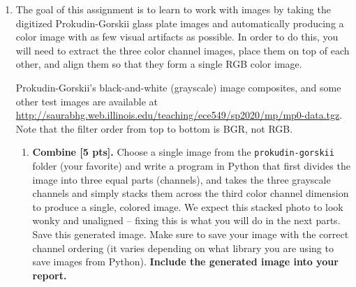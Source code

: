 \documentclass{article}
\def\pts#1{\textbf{[#1 pts]}}
\newenvironment{Q}{\clearpage \item}{\phantom{s} \bigskip}
\begin{document}
\begin{enumerate}
\begin{Q}
The goal of this assignment is to learn to work with images by taking the digitized Prokudin-Gorskii glass plate images and automatically producing a color image with as few visual artifacts as possible. In order to do this, you will need to extract the three color channel images, place them on top of each other, and align them so that they form a single RGB color image. 

Prokudin-Gorskii's black-and-white (grayscale) image composites, and some other test images are available at \url{http://saurabhg.web.illinois.edu/teaching/ece549/sp2020/mp/mp0-data.tgz}. Note that the filter order from top to bottom is BGR, not RGB.

\begin{enumerate}
    \item \textbf{Combine \pts{5}.} Choose a single image from the \texttt{prokudin-gorskii} folder (your favorite) and write a program in Python that first divides the image into three equal parts (channels), and takes the three grayscale channels and simply stacks them across the third color channel dimension to produce a single, colored image. We expect this stacked photo to look wonky and unaligned -- fixing this is what you will do in the next parts.
    Save this generated image. Make sure to save your image with the correct channel ordering (it varies depending on what library you are using to save images from Python).
    \textbf{Include the generated image into your report.} 
    

\end{enumerate}
\end{Q}
\end{enumerate}
\end{document}

